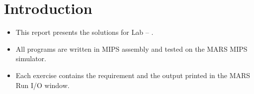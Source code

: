 \section{Introduction}
\begin{itemize}[itemsep=6pt]
  \item This report presents the solutions for Lab \LabNumber{} -- \textit{\LabTitle}.
  \item All programs are written in MIPS assembly and tested on the MARS MIPS simulator.
  \item Each exercise contains the requirement and the output printed in the MARS
        Run I/O window.
\end{itemize}
